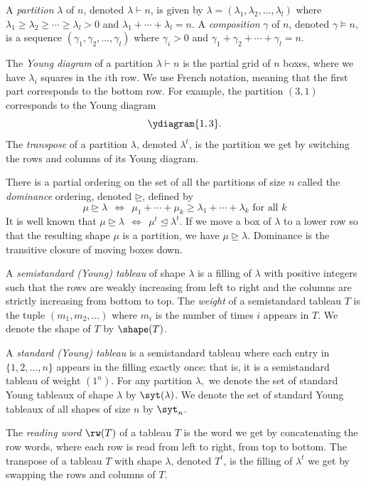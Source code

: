 A \textit{partition} $\lambda$ of $n$, denoted $\lambda\vdash n$,  is given by $\lambda = (\lambda_1,\lambda_2,\dots,\lambda_l)$ where $\lambda_1\geq \lambda_2\geq \cdots \geq \lambda_l>0$ and $\lambda_1+\cdots + \lambda_l = n$. A \textit{composition} $\gamma$ of $n$, denoted $\gamma\models n$, is a sequence $(\gamma_1,\gamma_2,\dots,\gamma_l)$ where $\gamma_i >0$ and $\gamma_1 + \gamma_2 + \cdots+\gamma_l = n$. 

The \textit{Young diagram} of a partition $\lambda\vdash n$ is the partial grid of $n$ boxes, where we have $\lambda_i$ squares in the $i$th row. 
We use French notation, meaning that the first part corresponds to the bottom row.  For example, the partition $(3,1)$ corresponds to the Young diagram \[\ydiagram{1,3}.\]
The \textit{transpose} of a partition $\lambda$, denoted $\lambda^t$, is the partition we get by switching the rows and columns of its Young diagram. 

There is a partial ordering on the set of all the partitions of size $n$ called the \textit{dominance} ordering, denoted $\unrhd$, defined by 
\[\mu\unrhd \lambda \ \  \Leftrightarrow \ \  \mu_1 + \cdots + \mu_k \geq \lambda_1+\cdots +  \lambda_k \text{ for all } k\]
It is well known that $\mu \unrhd \lambda \ \  \Leftrightarrow \ \   \mu^t \unlhd \lambda^t$. If we move a box of $\lambda$ to a lower row so that the resulting shape $\mu$ is a partition, we have $\mu \unrhd \lambda.$
Dominance is the transitive closure of moving boxes down. 

A \textit{semistandard (Young) tableau} of shape $\lambda$ is a filling of $\lambda$ with positive integers such that the rows are weakly increasing from left to right and the 
columns are strictly increasing from bottom to top. The \textit{weight} of a semistandard tableau $T$ is the tuple $(m_1, m_2,\dots)$  where $m_i$ is the number of times $i$ appears in $T$. We denote the shape of $T$ by $\shape(T)$.

A \textit{standard (Young) tableau} is a semistandard tableau where each entry in $\{1,2,\dots, n\}$ appears in the filling exactly once:  that is, it is a semistandard tableau of weight $(1^n)$. For any partition $\lambda, $ we denote the set of standard Young tableaux of shape $\lambda$ by $\syt(\lambda)$. We denote the set of standard Young tableaux of all shapes of size $n$ by $\syt_n$.

The \textit{reading word} $\rw(T)$ of a tableau $T$ is the word we get by concatenating the row words, where each row is read from left to right, from top to bottom. The transpose of a tableau $T$ with shape $\lambda$, denoted $T^t$, is the filling of $\lambda^t$ we get by swapping the rows and columns of $T$. 


